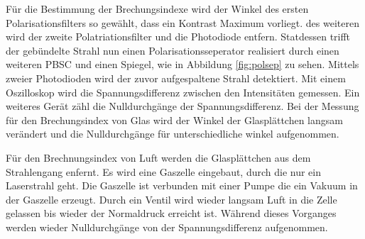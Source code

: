 Für die Bestimmung der Brechungsindexe wird der
Winkel des ersten Polarisationsfilters so gewählt, dass ein Kontrast Maximum vorliegt.
des weiteren wird der zweite Polatriationsfilter und die Photodiode entfern.
Statdessen trifft der gebündelte Strahl nun einen Polarisationsseperator realisiert durch einen
weiteren PBSC und einen Spiegel, wie in Abbildung \ref{fig:polsep} zu sehen.
Mittels zweier Photodioden wird der zuvor aufgespaltene Strahl detektiert.
Mit einem Oszilloskop wird die Spannungsdifferenz zwischen den Intensitäten
gemessen. Ein weiteres Gerät zähl die Nulldurchgänge der Spannungsdifferenz.
Bei der Messung für den Brechungsindex von Glas wird
der Winkel der Glasplättchen langsam verändert und die Nulldurchgänge für unterschiedliche
winkel aufgenommen.

Für den Brechnungsindex von Luft werden die Glasplättchen
aus dem Strahlengang enfernt. Es wird eine Gaszelle eingebaut, durch
die nur ein Laserstrahl geht. Die Gaszelle ist verbunden mit einer Pumpe
die ein Vakuum in der Gaszelle erzeugt. Durch ein Ventil wird wieder langsam
Luft in die Zelle gelassen bis wieder der Normaldruck erreicht ist. Während
dieses Vorganges werden wieder Nulldurchgänge von der Spannungsdifferenz aufgenommen.
